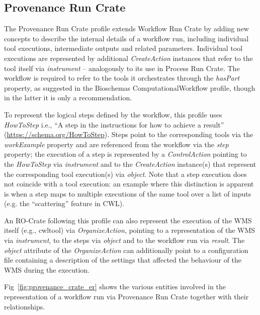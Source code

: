 \documentclass[10pt,letterpaper]{article}
\begin{document}
\subsection{Provenance Run Crate}\label{provenance-run-crate}

The Provenance Run Crate profile \cite{WRROC 2023c} extends Workflow Run Crate by adding new concepts to describe the internal details of a workflow run, including individual tool executions, intermediate outputs and related parameters.
Individual tool executions are represented by additional \emph{CreateAction} instances that refer to the tool itself via \emph{instrument} -- analogously to its use in Process Run Crate.
The workflow is required to refer to the tools it orchestrates through the \emph{hasPart} property, as suggested in the Bioschemas ComputationalWorkflow profile, though in the latter it is only a recommendation.

To represent the logical steps defined by the workflow, this profile uses \emph{HowToStep} i.e., “A step in the instructions for how to achieve a result” (\url{https://schema.org/HowToStep}).
Steps point to the corresponding tools via the \emph{workExample} property and are referenced from the workflow via the \emph{step} property; the execution of a step is represented by a \emph{ControlAction} pointing to the
\emph{HowToStep} via \emph{instrument} and to the \emph{CreateAction}
instance(s) that represent the corresponding tool execution(s) via
\emph{object}.
Note that a step execution does not coincide with a tool execution: an example where this distinction is apparent is when a step maps to multiple executions of the same tool over a list of inputs (e.g. the ``scattering'' feature in CWL).

An RO-Crate following this profile can also represent the execution of the WMS itself (e.g., cwltool) via
\emph{OrganizeAction}, pointing to a representation of the WMS via
\emph{instrument}, to the steps via \emph{object} and to the workflow run via \emph{result}.
The \emph{object} attribute of the
\emph{OrganizeAction} can additionally point to a configuration file containing a description of the settings that affected the behaviour of the WMS during the execution.

Fig~\ref{fig:provenance_crate_er} shows the various entities involved in the representation of a workflow run via Provenance Run Crate together with their relationships.
\end{document}
